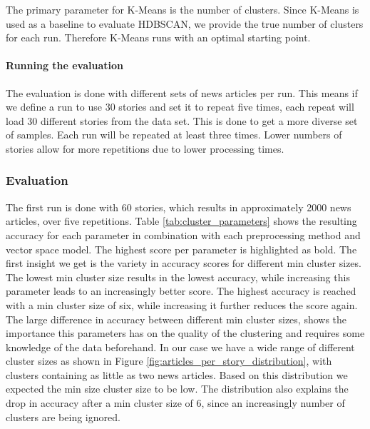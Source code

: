 The primary parameter for K-Means is the number of clusters. Since K-Means is used as a baseline to evaluate HDBSCAN, we provide the true number of clusters for each run. Therefore K-Means runs with an optimal starting point. 

\paragraph{Running the evaluation} The evaluation is done with different sets of news articles per run. This means if we define a run to use 30 stories and set it to repeat five times, each repeat will load 30 different stories from the data set. This is done to get a more diverse set of samples. Each run will be repeated at least three times. Lower numbers of stories allow for more repetitions due to lower processing times.   

\subsubsection{Evaluation}

The first run is done with 60 stories, which results in approximately 2000 news articles, over five repetitions. Table \ref{tab:cluster_parameters} shows the resulting accuracy for each parameter in combination with each preprocessing method and vector space model. The highest score per parameter is highlighted as bold. The first insight we get is the variety in accuracy scores for different min cluster sizes. The lowest min cluster size results in the lowest accuracy, while increasing this parameter leads to an increasingly better score. The highest accuracy is reached with a min cluster size of six, while increasing it further reduces the score again. The large difference in accuracy between different min cluster sizes, shows the importance this parameters has on the quality of the clustering and requires some knowledge of the data beforehand. In our case we have a wide range of different cluster sizes as shown in Figure \ref{fig:articles_per_story_distribution}, with clusters containing as little as two news articles. Based on this distribution we expected the min size cluster size to be low. The distribution also explains the drop in accuracy after a min cluster size of 6, since an increasingly number of clusters are being ignored.


